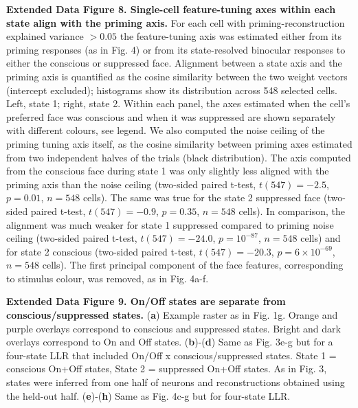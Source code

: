 \documentclass{article}
\begin{document}
\noindent\textbf{Extended Data Figure 8. Single-cell feature-tuning axes within each state align with the priming axis.} For each cell with priming-reconstruction explained variance $> 0.05$ the feature-tuning axis was estimated either from its priming responses (as in Fig. 4) or from its state-resolved binocular responses to either the conscious or suppressed face. Alignment between a state axis and the priming axis is quantified as the cosine similarity between the two weight vectors (intercept excluded); histograms show its distribution across 548 selected cells. Left, state 1; right, state 2. Within each panel, the axes estimated when the cell's preferred face was conscious and when it was suppressed are shown separately with different colours, see legend. We also computed the noise ceiling of the priming tuning axis itself, as the cosine similarity between priming axes estimated from two independent halves of the trials (black distribution). The axis computed from the conscious face during state 1 was only slightly less aligned with the priming axis than the noise ceiling (two-sided paired t-test, $t(547) = -2.5$, $p = 0.01$, $n = 548$ cells). The same was true for the state 2 suppressed face (two-sided paired t-test, $t(547) = -0.9$, $p = 0.35$, $n = 548$ cells). In comparison, the alignment was much weaker for state 1 suppressed compared to priming noise ceiling (two-sided paired t-test, $t(547) = -24.0$, $p = 10^{-87}$, $n = 548$ cells) and for state 2 conscious (two-sided paired t-test, $t(547) = -20.3$, $p = 6 \times 10^{-69}$, $n = 548$ cells). The first principal component of the face features, corresponding to stimulus colour, was removed, as in Fig. 4a-f.



\noindent\textbf{Extended Data Figure 9. On/Off states are separate from conscious/suppressed states.} (\textbf{a}) Example raster as in Fig. 1g. Orange and purple overlays correspond to conscious and suppressed states. Bright and dark overlays correspond to On and Off states. (\textbf{b})-(\textbf{d}) Same as Fig. 3e-g but for a four-state LLR that included On/Off x conscious/suppressed states. State 1 = conscious On+Off states, State 2 = suppressed On+Off states. As in Fig. 3, states were inferred from one half of neurons and reconstructions obtained using the held-out half. (\textbf{e})-(\textbf{h}) Same as Fig. 4c-g but for four-state LLR.
\end{document}

